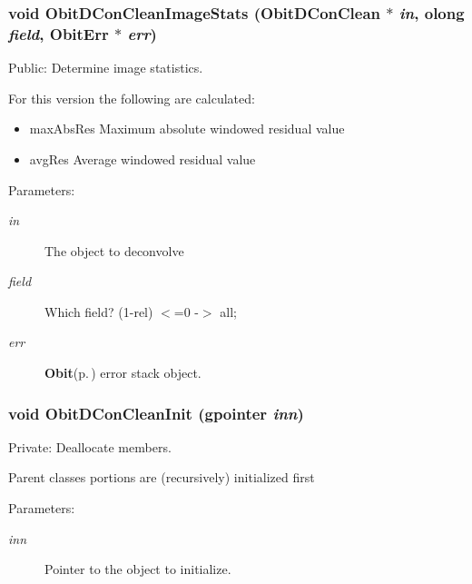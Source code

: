 \subsubsection{\setlength{\rightskip}{0pt plus 5cm}void Obit\-DCon\-Clean\-Image\-Stats ({\bf Obit\-DCon\-Clean} $\ast$ {\em in}, {\bf olong} {\em field}, {\bf Obit\-Err} $\ast$ {\em err})}\label{ObitDConClean_8c_a21}


Public: Determine image statistics. 

For this version the following are calculated: \begin{itemize}
\item max\-Abs\-Res Maximum absolute windowed residual value \item avg\-Res Average windowed residual value\end{itemize}
\begin{Desc}
\item[Parameters:]
\begin{description}
\item[{\em in}]The object to deconvolve \item[{\em field}]Which field? (1-rel) $<$=0 -$>$ all; \item[{\em err}]{\bf Obit}{\rm (p.\,\pageref{structObit})} error stack object. \end{description}
\end{Desc}
\subsubsection{\setlength{\rightskip}{0pt plus 5cm}void Obit\-DCon\-Clean\-Init (gpointer {\em inn})}\label{ObitDConClean_8c_a3}


Private: Deallocate members. 

Parent classes portions are (recursively) initialized first \begin{Desc}
\item[Parameters:]
\begin{description}
\item[{\em inn}]Pointer to the object to initialize. \end{description}
\end{Desc}
